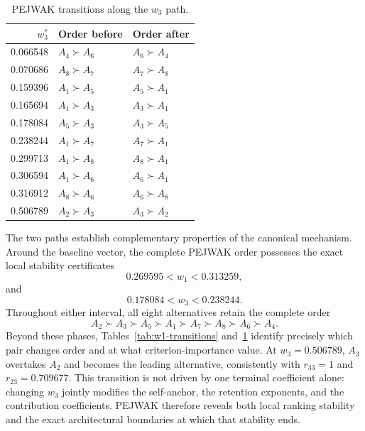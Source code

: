 \documentclass[reqno,11pt]{amsart}
\theoremstyle{definition}
\theoremstyle{plain}
\theoremstyle{remark}
\begin{document}
\begin{table}[htbp]
\centering
\scriptsize
\caption{PEJWAK transitions along the $w_3$ path.}
\label{tab:w3-transitions}
\begin{tabular}{rll}
\toprule
$w_3^*$ & Order before & Order after\\
\midrule
0.066548 & $A_4\succ A_6$ & $A_6\succ A_4$\\
0.070686 & $A_8\succ A_7$ & $A_7\succ A_8$\\
0.159396 & $A_1\succ A_5$ & $A_5\succ A_1$\\
0.165694 & $A_1\succ A_3$ & $A_3\succ A_1$\\
0.178084 & $A_5\succ A_3$ & $A_3\succ A_5$\\
0.238244 & $A_1\succ A_7$ & $A_7\succ A_1$\\
0.299713 & $A_1\succ A_8$ & $A_8\succ A_1$\\
0.306594 & $A_1\succ A_6$ & $A_6\succ A_1$\\
0.316912 & $A_8\succ A_6$ & $A_6\succ A_8$\\
0.506789 & $A_2\succ A_3$ & $A_3\succ A_2$\\
\bottomrule
\end{tabular}
\end{table}

The two paths establish complementary properties of the canonical
mechanism. Around the baseline vector, the complete PEJWAK order possesses
the exact local stability certificates
\begin{equation}
0.269595<w_1<0.313259,
\label{eq:w1-local-interval}
\end{equation}
and
\begin{equation}
0.178084<w_3<0.238244.
\label{eq:w3-local-interval}
\end{equation}
Throughout either interval, all eight alternatives retain the complete
order
\[
A_2\succ A_3\succ A_5\succ A_1\succ A_7\succ A_8\succ A_6\succ A_4.
\]
Beyond these phases, Tables~\ref{tab:w1-transitions}
and~\ref{tab:w3-transitions} identify precisely which pair changes order
and at what criterion-importance value. At $w_3=0.506789$, $A_3$
overtakes $A_2$ and becomes the leading alternative, consistently with
$r_{33}=1$ and $r_{23}=0.709677$. This transition is not driven by one
terminal coefficient alone: changing $w_3$ jointly modifies the
self-anchor, the retention exponents, and the contribution coefficients.
PEJWAK therefore reveals both local ranking stability and the exact
architectural boundaries at which that stability ends.
\end{document}
